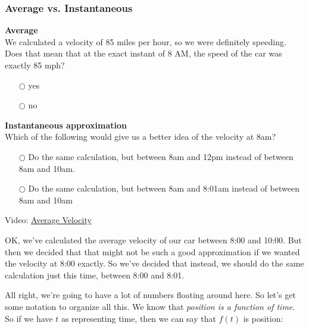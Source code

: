 \documentclass[pdftex, brazil, 12pt, twoside]{article}
\begin{document}
\subsubsection{Average vs. Instantaneous}
\label{u1-what-avg-inst}

\begin{exercise}
  \textbf{Average}\\%
  We calculated a velocity of 85 miles per hour, so we were
  definitely speeding. Does that mean that at the exact instant of 8 AM, the speed
  of the car was exactly 85 mph?
\begin{itemize}[noitemsep]
\item[$\bigcirc$] yes
\item[$\bigcirc$] no
\end{itemize}
\end{exercise}

\begin{exercise}
  \textbf{Instantaneous approximation}\\%
  Which of the following would give us a
  better idea of the velocity at 8am?
\begin{itemize}[noitemsep]
\item[$\bigcirc$] Do the same calculation, but between 8am and 12pm instead of
  between 8am and 10am.
\item[$\bigcirc$] Do the same calculation, but between 8am and 8:01am instead
  of between 8am and 10am
\end{itemize}
\end{exercise}

Video: \href{https://www.youtube.com/watch?v=BBvacxW-h7M}{Average Velocity}

OK, we've calculated the average velocity
of our car between 8:00 and 10:00.
But then we decided that that might not
be such a good approximation if we wanted
the velocity at 8:00 exactly.
So we've decided that instead, we
should do the same calculation just this time,
between 8:00 and 8:01.

All right, we're going to have a lot of numbers floating around
here.
So let's get some notation to organize all this.
We know that \emph{position is a function of time}.
So if we have $t$ as representing time,
then we can say that $f(t)$ is position:

\begin{figure}[H]
  \begin{center}
  \end{center}
\end{figure}
\end{document}
